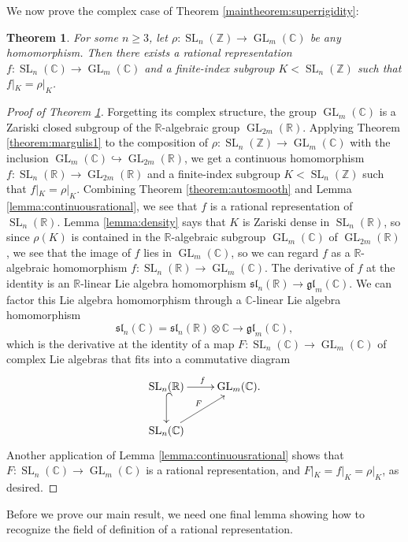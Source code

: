 \documentclass[11pt]{article}
\numberwithin{equation}{section}
\theoremstyle{plain}
\newtheorem{theorem}{Theorem}[section]
\theoremstyle{definition}
\theoremstyle{remark}
\DeclareMathOperator{\GL}{GL}
\DeclareMathOperator{\SL}{SL}
\newcommand\fsl{\ensuremath{\mathfrak{sl}}}
\newcommand\fgl{\ensuremath{\mathfrak{gl}}}
\newcommand\R{\ensuremath{\mathbb{R}}}
\newcommand\C{\ensuremath{\mathbb{C}}}
\newcommand\Z{\ensuremath{\mathbb{Z}}}
\begin{document}
We now prove the complex case of Theorem \ref{maintheorem:superrigidity}:

\begin{theorem}
\label{theorem:margulis2}
For some $n \geq 3$, let $\rho\colon \SL_n(\Z) \rightarrow \GL_m(\C)$ be any homomorphism.  Then there exists a rational representation 
$f\colon \SL_n(\C) \rightarrow \GL_m(\C)$ and a finite-index subgroup $K<\SL_n(\Z)$
such that $f|_K = \rho|_K$.
\end{theorem}

\begin{proof}[Proof of Theorem \ref{theorem:margulis2}]
Forgetting its complex structure, the group $\GL_m(\C)$ is a Zariski closed subgroup
of the $\R$-algebraic group $\GL_{2m}(\R)$.  Applying Theorem \ref{theorem:margulis1}
to the composition of $\rho\colon \SL_n(\Z) \rightarrow \GL_m(\C)$ with the
inclusion $\GL_m(\C) \hookrightarrow \GL_{2m}(\R)$, we get a continuous homomorphism
$f\colon \SL_n(\R) \rightarrow \GL_{2m}(\R)$ and a finite-index subgroup
$K<\SL_n(\Z)$ such that $f|_{K} = \rho|_{K}$.  Combining Theorem \ref{theorem:autosmooth}
and Lemma \ref{lemma:continuousrational}, we see that $f$ is a rational representation
of $\SL_n(\R)$.  Lemma \ref{lemma:density} says that $K$ is Zariski dense
in $\SL_n(\R)$, so since $\rho(K)$ is contained in the $\R$-algebraic subgroup
$\GL_m(\C)$ of $\GL_{2m}(\R)$, we see that the image of $f$ lies in
$\GL_m(\C)$, so we can regard $f$ as a $\R$-algebraic homomorphism
$f\colon \SL_n(\R) \rightarrow \GL_m(\C)$.  The derivative of $f$ at the identity is an
$\R$-linear Lie algebra homomorphism $\fsl_n(\R) \rightarrow \fgl_m(\C)$.  We can factor
this Lie algebra homomorphism through a $\C$-linear Lie algebra homomorphism
\[\fsl_n(\C) = \fsl_n(\R) \otimes \C  \rightarrow \fgl_m(\C),\]
which is the derivative at the identity of a map $F\colon \SL_n(\C) \rightarrow \GL_m(\C)$
of complex Lie algebras that fits into a commutative diagram
\[\xymatrix{
\SL_n(\R) \ar[r]^{f} \ar@{^{(}->}[d] & \GL_m(\C). \\
\SL_n(\C) \ar[ru]^{F} & }\]
Another application of Lemma \ref{lemma:continuousrational} shows that
$F\colon \SL_n(\C) \rightarrow \GL_m(\C)$ is a rational representation, and
$F|_K = f|_K = \rho|_K$, as desired.
\end{proof}

Before we prove our main result, we need one final lemma showing how to recognize
the field of definition of a rational representation.
\end{document}
